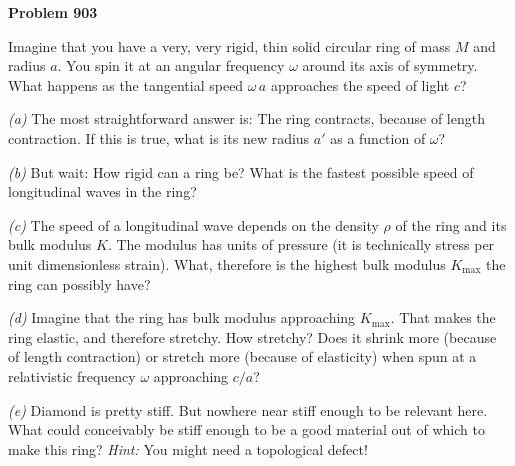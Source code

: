 \documentclass[12pt]{article}
\begin{document}
\begin{pottproblem}
\textbf{Problem 903}

Imagine that you have a very, very rigid, thin solid circular ring of mass $M$ and radius $a$.
You spin it at an angular frequency $\omega$ around its axis of symmetry.
What happens as the tangential speed $\omega\,a$ approaches the speed of light $c$?

\textsl{(a)} The most straightforward answer is: The ring contracts, because of length contraction.
If this is true, what is its new radius $a'$ as a function of $\omega$?

\textsl{(b)} But wait: How rigid can a ring be? What is the fastest possible speed of
longitudinal waves in the ring?

\textsl{(c)} The speed of a longitudinal wave depends on the density $\rho$ of the ring and its
bulk modulus $K$. The modulus has units of pressure (it is technically stress per unit dimensionless strain).
What, therefore is the highest bulk modulus $K_\mathrm{max}$ the ring can possibly have?

\textsl{(d)} Imagine that the ring has bulk modulus approaching $K_\mathrm{max}$.
That makes the ring elastic, and therefore stretchy.
How stretchy? Does it shrink more (because of length contraction) or stretch more (because of elasticity)
when spun at a relativistic frequency $\omega$ approaching $c/a$?

\textsl{(e)} Diamond is pretty stiff. But nowhere near stiff enough to be relevant here.
What could conceivably be stiff enough to be a good material out of which to make this ring?
\textsl{Hint:} You might need a topological defect!

\end{pottproblem}
\end{document}

